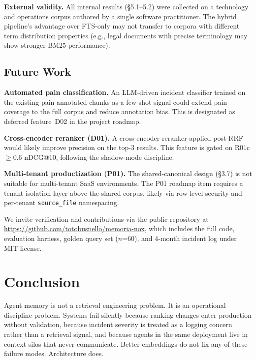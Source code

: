 \textbf{External validity.} All internal results (\S5.1--5.2) were collected on a
technology and operations corpus authored by a single software practitioner. The hybrid
pipeline's advantage over FTS-only may not transfer to corpora with different term
distribution properties (e.g., legal documents with precise terminology may show stronger
BM25 performance).

\subsection{Future Work}

\textbf{Automated pain classification.} An LLM-driven incident classifier trained on the
existing pain-annotated chunks as a few-shot signal could extend pain coverage to the full
corpus and reduce annotation bias. This is designated as deferred feature~D02 in the
project roadmap.

\textbf{Cross-encoder reranker (D01).} A cross-encoder reranker applied post-RRF would
likely improve precision on the top-3 results. This feature is gated on
R01c $\geq 0.6$ nDCG@10, following the shadow-mode discipline.

\textbf{Multi-tenant productization (P01).} The shared-canonical design (\S3.7) is not
suitable for multi-tenant SaaS environments. The P01 roadmap item requires a
tenant-isolation layer above the shared corpus, likely via row-level security and per-tenant
\texttt{source\_file} namespacing.

We invite verification and contributions via the public repository at
\url{https://github.com/totobusnello/memoria-nox}, which includes the full code, evaluation
harness, golden query set ($n$=60), and 4-month incident log under MIT license.

\section{Conclusion}

Agent memory is not a retrieval engineering problem. It is an operational discipline
problem. Systems fail silently because ranking changes enter production without validation,
because incident severity is treated as a logging concern rather than a retrieval signal,
and because agents in the same deployment live in context silos that never communicate.
Better embeddings do not fix any of these failure modes. Architecture does.

